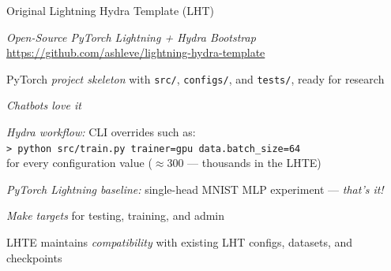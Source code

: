 \begin{slide}[\slideopts,toc={Original LHT}]{Original Lightning Hydra Template (LHT)}

  \emph{Open-Source PyTorch Lightning + Hydra Bootstrap}\\
  \url{https://github.com/ashleve/lightning-hydra-template}

  \begin{itemize}
    \mpitem PyTorch \emph{project skeleton} with \texttt{src/}, \texttt{configs/}, and \texttt{tests/}, ready for research

    \mpitem \emph{Chatbots love it} %

    \mpitem \emph{Hydra workflow:} CLI overrides such as:\\
    \hspace{0.1em}\texttt{> python src/train.py trainer=gpu data.batch\_size=64}\\
    for every configuration value ($\approx 300$ --- thousands in the LHTE)

    \mpitem \emph{PyTorch Lightning baseline:} single-head MNIST MLP experiment --- \emph{that's it!} %

    \mpitem \emph{Make targets} for testing, training, and admin %

    \mpitem LHTE maintains \emph{compatibility} with existing LHT configs, datasets, and checkpoints

  \end{itemize}

\end{slide}

